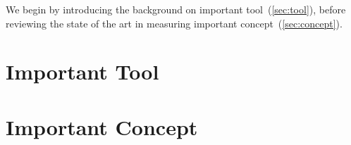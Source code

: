 We begin by introducing the background on important tool~(\autoref{sec:tool}), before reviewing the state of the art in measuring important concept~(\autoref{sec:concept}).

\section{Important Tool}
\label{sec:tool}

\lipsum[2-4]

\section{Important Concept}
\label{sec:concept}

\lipsum[2-4]
